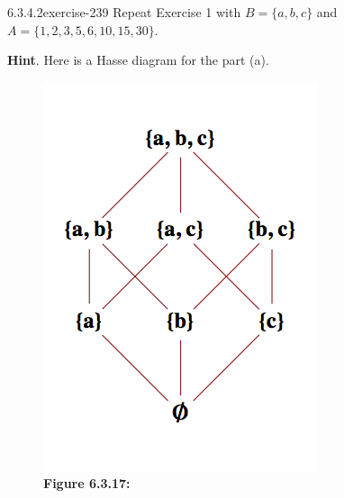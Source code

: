 \documentclass[twoside,10pt,]{book}
\numberwithin{equation}{section}
\begin{document}
\begin{divisionsolution}{6.3.4.2}{}{exercise-239}%
\hypertarget{p-2057}{}%
Repeat Exercise 1 with \(B = \{a, b, c\}\) and \(A = \{1, 2, 3, 5, 6, 10, 15, 30\}\).%
\par\smallskip%
\noindent\textbf{Hint}.\quad%
\hypertarget{p-2058}{}%
Here is a Hasse diagram for the part (a).%
\begin{figure}
\centering
\includegraphics[width=1\linewidth]{images/fig-subsets-3-hasse.png}
\caption*{\textbf{Figure 6.3.17:} }
\end{figure}
\end{divisionsolution}%
\end{document}
